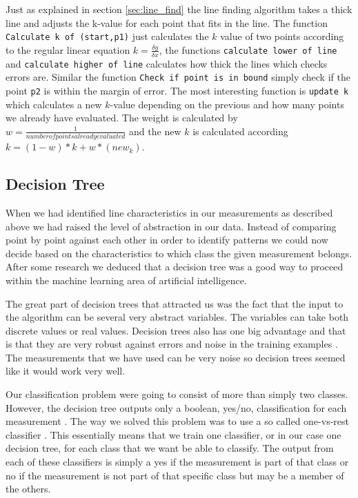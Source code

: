 \documentclass[a4paper, 10pt, conference]{ieeeconf}      %
\begin{document}
Just as explained in section \ref{sec:line_find} the line finding algorithm takes a thick line and adjusts the k-value for each point that fits in the line. The function \texttt{Calculate k of (start,p1)} just calculates the $k$ value of two points according to the regular linear equation $k = \frac{\delta y}{\delta x}$, the functions \texttt{calculate lower of line} and \texttt{calculate higher of line} calculates how thick the lines which checks errors are. Similar the function \texttt{Check if point is in bound} simply check if the point \texttt{p2} is within the margin of error. The most interesting function is \texttt{update k} which calculates a new $k$-value depending on the previous and how many points we already have evaluated. The weight is calculated by $w = \frac{1}{number of points already evaluated}$ and the new $k$ is calculated according $k = (1-w)*k + w*(new_k)$.

\subsection{Decision Tree}
When we had identified line characteristics in our measurements as described above we had raised the level of abstraction in our data. Instead of comparing point by point against each other in order to identify patterns we could now decide based on the characteristics to which class the given measurement belongs. After some research we deduced that a decision tree was a good way to proceed within the machine learning area of artificial intelligence.

The great part of decision trees that attracted us was the fact that the input to the algorithm can be several very abstract variables. The variables can take both discrete values or real values. Decision trees also has one big advantage and that is that they are very robust against errors and noise in the training examples \cite{ml3}. The measurements that we have used can be very noise so decision trees seemed like it would work very well.

Our classification problem were going to consist of more than simply two classes. However, the decision tree outputs only a boolean, yes/no, classification for each measurement \cite{ml3}. The way we solved this problem was to use a so called one-vs-rest classifier \cite{praml}. This essentially means that we train one classifier, or in our case one decision tree, for each class that we want be able to classify. The output from each of these classifiers is simply a yes if the measurement is part of that class or no if the measurement is not part of that specific class but may be a member of the others.
\end{document}
